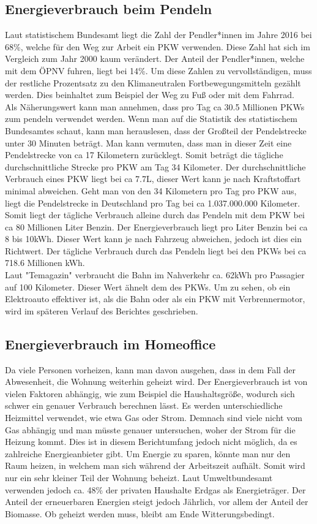 \documentclass[a4paper,12pt]{scrartcl}
\begin{document}
\subsection{Energieverbrauch beim Pendeln}
Laut statistischem Bundesamt liegt die Zahl der Pendler*innen im Jahre 2016 bei 68\%, welche für den Weg zur Arbeit ein PKW verwenden. Diese Zahl hat sich im Vergleich zum Jahr 2000 kaum verändert. Der Anteil der Pendler*innen, welche mit dem ÖPNV fuhren, liegt bei 14\%. Um diese Zahlen zu vervollständigen, muss der restliche Prozentsatz zu den Klimaneutralen Fortbewegungsmitteln gezählt werden. Dies beinhaltet zum Beispiel der Weg zu Fuß oder mit dem Fahrrad.\\
Als Näherungswert kann man annehmen, dass pro Tag ca 30.5 Millionen PKWs zum pendeln verwendet werden. Wenn man auf die Statistik des statistischem Bundesamtes schaut, kann man herauslesen, dass der Großteil der Pendelstrecke unter 30 Minuten beträgt. Man kann vermuten, dass man in dieser Zeit eine Pendelstrecke von ca 17 Kilometern zurücklegt. Somit beträgt die tägliche durchschnittliche Strecke pro PKW am Tag 34 Kilometer. Der durchschnittliche Verbrauch eines PKW liegt bei ca 7.7L, dieser Wert kann je nach Kraftstoffart minimal abweichen. Geht man von den 34 Kilometern pro Tag pro PKW aus, liegt die Pendelstrecke in Deutschland pro Tag bei ca 1.037.000.000 Kilometer. Somit liegt der tägliche Verbrauch alleine durch das Pendeln mit dem PKW bei ca 80 Millionen Liter Benzin.
Der Energieverbrauch liegt pro Liter Benzin bei ca 8 bis 10kWh. Dieser Wert kann je nach Fahrzeug abweichen, jedoch ist dies ein Richtwert. Der tägliche Verbrauch durch das Pendeln liegt bei den PKWs bei ca 718.6 Millionen kWh.\\
Laut "Temagazin" verbraucht die Bahn im Nahverkehr ca. 62kWh pro Passagier auf 100 Kilometer. Dieser Wert ähnelt dem des PKWs. Um zu sehen, ob ein Elektroauto effektiver ist, als die Bahn oder als ein PKW mit Verbrennermotor, wird im späteren Verlauf des Berichtes geschrieben.


\subsection{Energieverbrauch im Homeoffice}
Da viele Personen vorheizen, kann man davon ausgehen, dass in dem Fall der Abwesenheit, die Wohnung weiterhin geheizt wird. Der Energieverbrauch ist von vielen Faktoren abhängig, wie zum Beispiel die Haushaltsgröße, wodurch sich schwer ein genauer Verbrauch berechnen lässt. Es werden unterschiedliche Heizmittel verwendet, wie etwa Gas oder Strom. Demnach sind viele nicht vom Gas abhängig und man müsste genauer untersuchen, woher der Strom für die Heizung kommt. Dies ist in diesem Berichtumfang jedoch nicht möglich, da es zahlreiche Energieanbieter gibt. Um Energie zu sparen, könnte man nur den Raum heizen, in welchem man sich während der Arbeitszeit aufhält. Somit wird nur ein sehr kleiner Teil der Wohnung beheizt. Laut Umweltbundesamt verwenden jedoch ca. 48\% der privaten Haushalte Erdgas als Energieträger. Der Anteil der erneuerbaren Energien steigt jedoch Jährlich, vor allem der Anteil der Biomasse. Ob geheizt werden muss, bleibt am Ende Witterungsbedingt.
\end{document}
